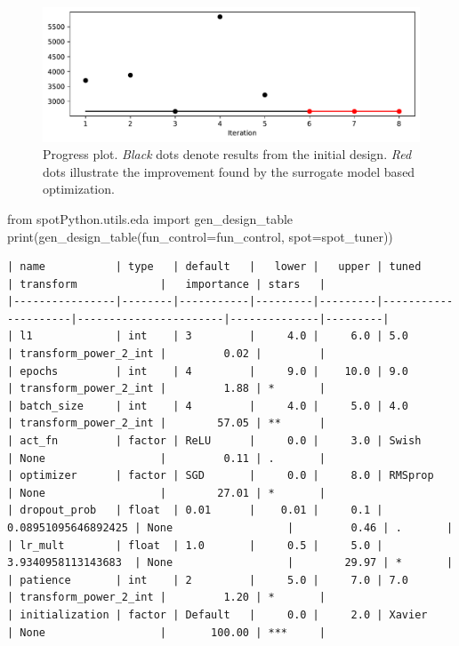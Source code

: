 \documentclass[
  letterpaper,
  DIV=11,
  numbers=noendperiod]{scrreprt}
\newenvironment{Shaded}{\begin{snugshade}}{\end{snugshade}}
\newcommand{\BuiltInTok}[1]{\textcolor[rgb]{0.00,0.23,0.31}{#1}}
\newcommand{\ImportTok}[1]{\textcolor[rgb]{0.00,0.46,0.62}{#1}}
\newcommand{\NormalTok}[1]{\textcolor[rgb]{0.00,0.23,0.31}{#1}}
\newcommand{\OperatorTok}[1]{\textcolor[rgb]{0.37,0.37,0.37}{#1}}
\begin{document}
\begin{figure}[H]

{\centering \includegraphics{031_spot_lightning_linear_diabetes_files/figure-pdf/cell-13-output-1.pdf}

}

\caption{Progress plot. \emph{Black} dots denote results from the
initial design. \emph{Red} dots illustrate the improvement found by the
surrogate model based optimization.}

\end{figure}%

\begin{Shaded}
\begin{Highlighting}[]
\ImportTok{from}\NormalTok{ spotPython.utils.eda }\ImportTok{import}\NormalTok{ gen\_design\_table}
\BuiltInTok{print}\NormalTok{(gen\_design\_table(fun\_control}\OperatorTok{=}\NormalTok{fun\_control, spot}\OperatorTok{=}\NormalTok{spot\_tuner))}
\end{Highlighting}
\end{Shaded}

\begin{verbatim}
| name           | type   | default   |   lower |   upper | tuned               | transform             |   importance | stars   |
|----------------|--------|-----------|---------|---------|---------------------|-----------------------|--------------|---------|
| l1             | int    | 3         |     4.0 |     6.0 | 5.0                 | transform_power_2_int |         0.02 |         |
| epochs         | int    | 4         |     9.0 |    10.0 | 9.0                 | transform_power_2_int |         1.88 | *       |
| batch_size     | int    | 4         |     4.0 |     5.0 | 4.0                 | transform_power_2_int |        57.05 | **      |
| act_fn         | factor | ReLU      |     0.0 |     3.0 | Swish               | None                  |         0.11 | .       |
| optimizer      | factor | SGD       |     0.0 |     8.0 | RMSprop             | None                  |        27.01 | *       |
| dropout_prob   | float  | 0.01      |    0.01 |     0.1 | 0.08951095646892425 | None                  |         0.46 | .       |
| lr_mult        | float  | 1.0       |     0.5 |     5.0 | 3.9340958113143683  | None                  |        29.97 | *       |
| patience       | int    | 2         |     5.0 |     7.0 | 7.0                 | transform_power_2_int |         1.20 | *       |
| initialization | factor | Default   |     0.0 |     2.0 | Xavier              | None                  |       100.00 | ***     |
\end{verbatim}
\end{document}
